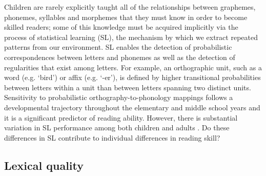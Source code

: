 \documentclass[review]{elsarticle}
\begin{document}
Children are rarely explicitly taught all of the relationships between graphemes, phonemes, syllables and morphemes that they must know in order to become skilled readers; some of this knowledge must be acquired implicitly via the process of  statistical learning (SL), the mechanism by which we extract repeated patterns from our environment. SL enables the detection of probabilistic correspondences between letters and phonemes as well as the detection of regularities that exist among letters. For example, an orthographic unit, such as a word (e.g. `bird') or affix (e.g. `-er'), is defined by higher transitional probabilities between letters within a unit than between letters spanning two distinct units. Sensitivity to probabilistic orthography-to-phonology mappings follows a developmental trajectory throughout the elementary and middle school years \citep{treimanSpellingStatisticalLearning2006} and  it is  a significant predictor of reading ability. However, there is substantial variation in SL performance among both children and adults \citep{arciuliStatisticalLearningRelated2012}.   Do these differences in SL contribute to individual differences in  reading skill?

\subsection{Lexical quality}




\end{document}
